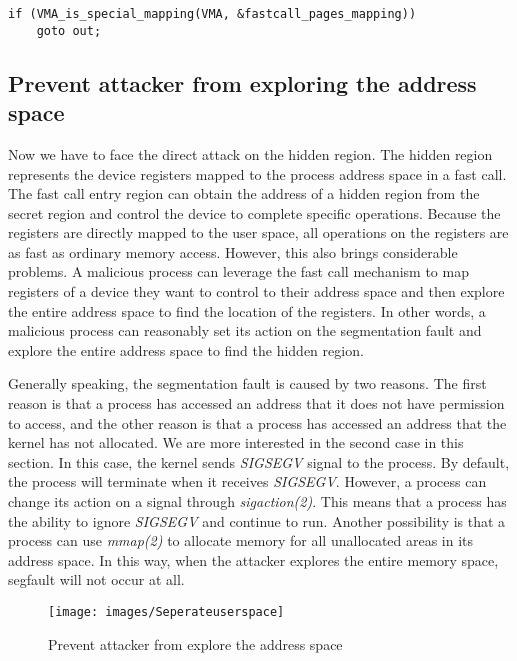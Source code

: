 \begin{lstlisting}[style=CStyle]
  if (VMA_is_special_mapping(VMA, &fastcall_pages_mapping))
    goto out;
\end{lstlisting}
 

\subsection{Prevent attacker from exploring the address space}
Now we have to face the direct attack on the hidden region. 
The hidden region represents the device registers mapped to the
 process address space\cite{10.5555/983550} in a fast call. The fast call entry region 
 can obtain the address of a  hidden region from the secret region and
  control the device to complete specific operations. Because the 
  registers are directly mapped to the user space, all operations 
  on the registers are as fast as ordinary memory access. However, 
  this also brings considerable problems. A malicious process can 
  leverage the fast call mechanism to map registers of a device 
  they want to control to their address space and then explore the 
  entire address space to find the location of the registers. 
  In other words, a malicious process can reasonably set its 
  action on the segmentation fault\cite{21} and explore the entire address space to find the hidden region.

Generally speaking, the segmentation fault is caused by two reasons. 
The first reason is that a process has accessed an address 
that it does not have permission to access, and the other 
reason is that a process has accessed an address that the 
kernel has not allocated. We are more interested in the 
second case in this section. In this case, the kernel sends 
\emph{SIGSEGV}\cite{21} signal to the process. By default,  the process will 
terminate when it receives \emph{SIGSEGV}.  However, a process can 
change its action on a signal through \emph{sigaction(2)}\cite{20}. This 
means that a process has the ability to ignore \emph{SIGSEGV} 
and continue to run. Another possibility is that a process 
can use \emph{mmap(2)}\cite{22} to allocate memory for all unallocated 
areas in its address space. In this way, when the attacker 
explores the entire memory space, segfault will not occur at all.

\begin{figure}[H]
  \centering
  \texttt{[image: images/Seperateuserspace]}
  \caption[Prevent attacker from explore the address space]{Prevent attacker from explore the address space}
  \label{fig:Seperateuserspace}
\end{figure}


